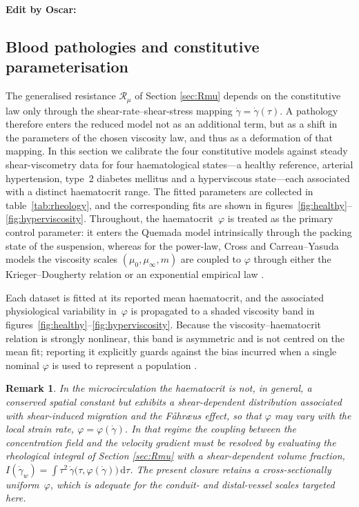 \documentclass[lineno]{jfm}
\newtheorem{remark}{Remark}
\newcommand{\orn}[1]{{\color{red} \textbf{Edit by Oscar:} #1}}
\begin{document}
\orn{

\subsection{Blood pathologies and constitutive parameterisation}
\label{sec:pathologies}

The generalised resistance $\mathcal{R}_\mu$ of Section \ref{sec:Rmu} depends on
the constitutive law only through the shear-rate--shear-stress mapping
$\dot\gamma=\dot\gamma(\tau)$. A pathology therefore enters the reduced model not
as an additional term, but as a shift in the parameters of the chosen viscosity
law, and thus as a deformation of that mapping. In this section we calibrate the
four constitutive models against steady shear-viscometry data for four
haematological states---a healthy reference, arterial hypertension, type~2
diabetes mellitus and a hyperviscous state---each associated with a distinct
haematocrit range. The fitted parameters are collected in
table~\ref{tab:rheology}, and the corresponding fits are shown in
figures~\ref{fig:healthy}--\ref{fig:hyperviscosity}. Throughout, the
haematocrit~$\varphi$ is treated as the primary control parameter: it enters the
Quemada model intrinsically through the packing state of the suspension, whereas
for the power-law, Cross and Carreau--Yasuda models the viscosity scales
$(\mu_0,\mu_\infty,m)$ are coupled to $\varphi$ through either the
Krieger--Dougherty relation \cite{Krieger1959} or an exponential
empirical law \citep{CokeletA1963,CokeletB1963}.

Each dataset is fitted at its reported mean haematocrit, and the associated
physiological variability in~$\varphi$ is propagated to a shaded viscosity band in
figures~\ref{fig:healthy}--\ref{fig:hyperviscosity}. Because the
viscosity--haematocrit relation is strongly nonlinear, this band is asymmetric
and is not centred on the mean fit; reporting it explicitly guards against the
bias incurred when a single nominal $\varphi$ is used to represent a population
\cite{Chien1987,cho2008hemorheological,Westgard2024}.

\begin{remark}
In the microcirculation the haematocrit is not, in general, a conserved spatial
constant but exhibits a shear-dependent distribution associated with
shear-induced migration and the F\aa hr\ae us effect, so that $\varphi$ may vary
with the local strain rate, $\varphi=\varphi(\dot\gamma)$. In that regime the coupling
between the concentration field and the velocity gradient must be resolved by
evaluating the rheological integral of Section \ref{sec:Rmu} with a
shear-dependent volume fraction, $I(\dot\gamma_w)=\int \tau^2\,
\dot\gamma\bigl(\tau,\varphi(\dot\gamma)\bigr)\,\mathrm{d}\tau$. The present
closure retains a cross-sectionally uniform~$\varphi$, which is adequate for the
conduit- and distal-vessel scales targeted here.
\end{remark}

}
\end{document}
